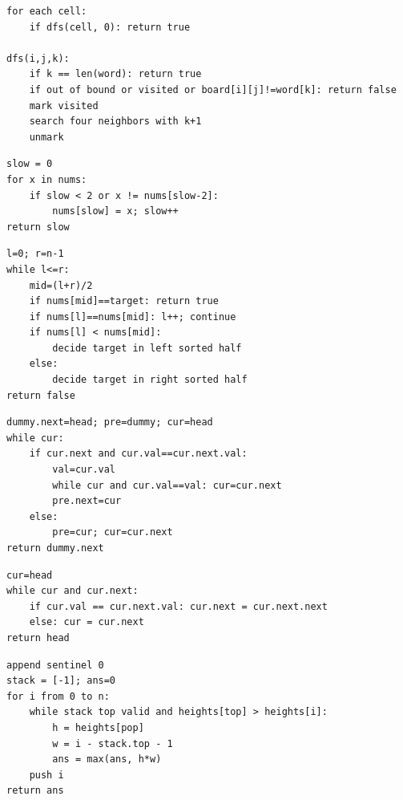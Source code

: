 \documentclass[11pt,a4paper]{ctexart}
\begin{document}
\begin{verbatim}
for each cell:
    if dfs(cell, 0): return true

dfs(i,j,k):
    if k == len(word): return true
    if out of bound or visited or board[i][j]!=word[k]: return false
    mark visited
    search four neighbors with k+1
    unmark
\end{verbatim}

\begin{verbatim}
slow = 0
for x in nums:
    if slow < 2 or x != nums[slow-2]:
        nums[slow] = x; slow++
return slow
\end{verbatim}

\begin{verbatim}
l=0; r=n-1
while l<=r:
    mid=(l+r)/2
    if nums[mid]==target: return true
    if nums[l]==nums[mid]: l++; continue
    if nums[l] < nums[mid]:
        decide target in left sorted half
    else:
        decide target in right sorted half
return false
\end{verbatim}

\begin{verbatim}
dummy.next=head; pre=dummy; cur=head
while cur:
    if cur.next and cur.val==cur.next.val:
        val=cur.val
        while cur and cur.val==val: cur=cur.next
        pre.next=cur
    else:
        pre=cur; cur=cur.next
return dummy.next
\end{verbatim}

\begin{verbatim}
cur=head
while cur and cur.next:
    if cur.val == cur.next.val: cur.next = cur.next.next
    else: cur = cur.next
return head
\end{verbatim}

\begin{verbatim}
append sentinel 0
stack = [-1]; ans=0
for i from 0 to n:
    while stack top valid and heights[top] > heights[i]:
        h = heights[pop]
        w = i - stack.top - 1
        ans = max(ans, h*w)
    push i
return ans
\end{verbatim}
\end{document}
